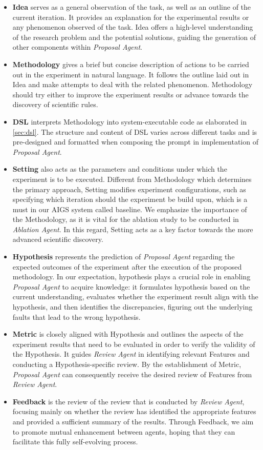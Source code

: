 \documentclass{article} %
\begin{document}
\begin{itemize}
    \item \textbf{Idea} serves as a general observation of the task, as well as an outline of the current iteration. It provides an explanation for the experimental results or any phenomenon observed of the task. Idea offers a high-level understanding of the research problem and the potential solutions, guiding the generation of other components within \textit{Proposal Agent}.
    \item \textbf{Methodology} gives a brief but concise description of actions to be carried out in the experiment in natural language. It follows the outline laid out in Idea and make attempts to deal with the related phenomenon. Methodology should try either to improve the experiment results or advance towards the discovery of scientific rules.
    \item \textbf{DSL} interprets Methodology into system-executable code as elaborated in \ref{sec:dsl}. The structure and content of DSL varies across different tasks and is pre-designed and formatted when composing the prompt in implementation of \textit{Proposal Agent}.
    \item \textbf{Setting} also acts as the parameters and conditions under which the experiment is to be executed. Different from Methodology which determines the primary approach, Setting modifies experiment configurations, such as specifying which iteration should the experiment be build upon, which is a must in our AIGS system called baseline. We emphasize the importance of the Methodology, as it is vital for the ablation study to be conducted in \textit{Ablation Agent}. In this regard, Setting acts as a key factor towards the more advanced scientific discovery.
    \item \textbf{Hypothesis} represents the prediction of \textit{Proposal Agent} regarding the expected outcomes of the experiment after the execution of the proposed methodology. In our expectation, hypothesis plays a crucial role in enabling \textit{Proposal Agent} to acquire knowledge: it formulates hypothesis based on the current understanding, evaluates whether the experiment result align with the hypothesis, and then identifies the discrepancies, figuring out the underlying faults that lead to the wrong hypothesis. 
    \item \textbf{Metric} is closely aligned with Hypothesis and outlines the aspects of the experiment results that need to be evaluated in order to verify the validity of the Hypothesis. It guides \textit{Review Agent} in identifying relevant Features and conducting a Hypothesis-specific review. By the establishment of Metric, \textit{Proposal Agent} can consequently receive the desired review of Features from \textit{Review Agent}. 
    \item \textbf{Feedback} is the review of the review that is conducted by \textit{Review Agent}, focusing mainly on whether the review has identified the appropriate features and provided a sufficient summary of the results. Through Feedback, we aim to promote mutual enhancement between agents, hoping that they can facilitate this fully self-evolving process.
\end{itemize}
\end{document}
